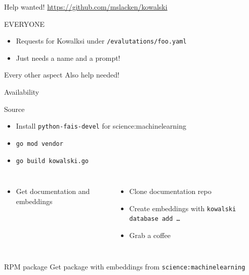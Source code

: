 \documentclass[aspectratio=169]{beamer}
\begin{document}
\begin{frame}{Help wanted!}
\href{https://github.com/mslacken/kowalski}{https://github.com/mslacken/kowalski}
\begin{block}{EVERYONE}
\begin{itemize}
  \item Requests for Kowalksi under \texttt{/evalutations/foo.yaml}
  \item Just needs a name and a prompt!
\end{itemize}
\end{block}
\begin{block}{Every other aspect}
Also help needed!
\end{block}
\end{frame}

\begin{frame}{Availability}
\begin{block}{Source}
\begin{itemize}
  \item Install \texttt{python-fais-devel} for {science:machinelearning}
  \item \texttt{go mod vendor}
  \item \texttt{go build kowalski.go}
\end{itemize}
\begin{columns}
\begin{itemize}
  \item Get documentation and embeddings
\end{itemize}
\begin{itemize}
  \item Clone documentation repo
  \item Create embeddings with \texttt{kowalski database add \dots}
  \item Grab a coffee
\end{itemize}
\end{columns}
\end{block}
\begin{block}{RPM package}
  Get package with embeddings from \texttt{science:machinelearning}
\end{block}
\end{frame}
\end{document}

